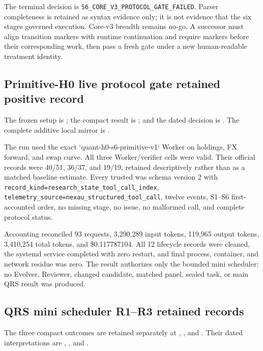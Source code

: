 The terminal decision is
\texttt{S6\_CORE\_V3\_PROTOCOL\_GATE\_FAILED}. Parser completeness is
retained as syntax evidence only; it is not evidence that the six stages
governed execution. Core-v3 breadth remains no-go. A successor must align
transition markers with runtime continuation and require markers before their
corresponding work, then pass a fresh gate under a new human-readable treatment
identity.

\subsection{Primitive-H0 live protocol gate retained positive record}

The frozen setup is
; the compact
result is
; and the dated
decision is
.
The complete additive local mirror is
.

The run used the exact `quant-h0-s6-primitive-v1` Worker on holdings, FX
forward, and swap curve. All three Worker/verifier cells were valid. Their
official records were 40/51, 36/37, and 19/19, retained descriptively rather
than as a matched baseline estimate. Every trusted
 was schema version 2 with
\texttt{record\_kind=research\_state\_tool\_call\_index},
\texttt{telemetry\_source=nexau\_structured\_tool\_call}, twelve events,
S1--S6 first-accounted order, no missing stage, no issue, no malformed call,
and complete protocol status.

Accounting reconciled 93 requests, 3,290,289 input tokens, 119,965 output
tokens, 3,410,254 total tokens, and \$0.117787104. All 12 lifecycle records were
cleaned, the systemd service completed with zero restart, and final process,
container, and network residue was zero. The result authorizes only the bounded
mini scheduler; no Evolver, Reviewer, changed candidate, matched panel, sealed
task, or main QRS result was produced.

\subsection{QRS mini scheduler R1--R3 retained records}

The three compact outcomes are retained separately at
,
, and
. Their dated
interpretations are
,
, and
.


